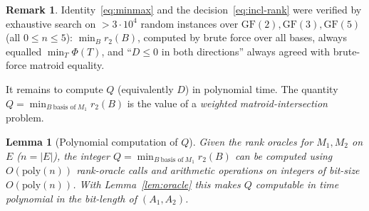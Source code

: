 \documentclass{amsart}
\theoremstyle{plain}
\newtheorem{lemma}{Lemma}
\theoremstyle{definition}
\newtheorem{remark}{Remark}
\begin{document}
\begin{remark}
Identity~\eqref{eq:minmax} and the decision~\eqref{eq:incl-rank} were verified by exhaustive
search on $>3\cdot10^4$ random instances over $\mathrm{GF}(2),\mathrm{GF}(3),\mathrm{GF}(5)$
(all $0\le n\le5$): $\min_B r_2(B)$, computed by brute force over all bases, always equalled
$\min_T\Phi(T)$, and ``$D\le0$ in both directions'' always agreed with brute-force matroid
equality.
\end{remark}

It remains to compute $Q$ (equivalently $D$) in polynomial time. The quantity
$Q=\min_{B\ \text{basis of}\ M_1}r_2(B)$ is the value of a \emph{weighted matroid-intersection}
problem.

\begin{lemma}[Polynomial computation of $Q$]\label{lem:wmi}
Given the rank oracles for $M_1,M_2$ on $E$ ($n=|E|$), the integer
$Q=\min_{B\ \text{basis of}\ M_1}r_2(B)$ can be computed using $O(\mathrm{poly}(n))$ rank-oracle
calls and arithmetic operations on integers of bit-size $O(\mathrm{poly}(n))$. With
Lemma~\ref{lem:oracle} this makes $Q$ computable in time polynomial in the bit-length of
$(A_1,A_2)$.
\end{lemma}
\end{document}
